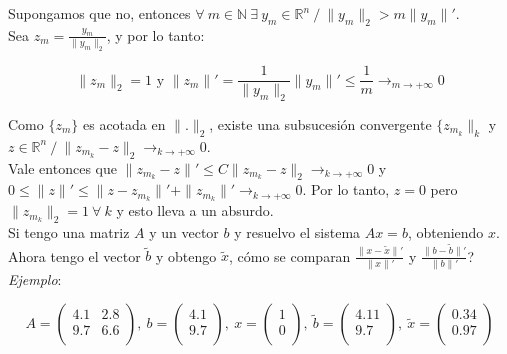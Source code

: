 Supongamos que no, entonces $\forall \ m \in \mathbb{N}\ \exists \ y_{m} \in \mathbb{R}^{n}\ / \ \|y_{m}\|_{2} > m \|y_{m}\|'$.\\

Sea $z_{m} = \frac{y_{m}}{\|y_{m}\|_{2}}$, y por lo tanto:

$$\|z_{m}\|_{2} = 1 \text{ y } \|z_{m}\|' = \frac{1}{\|y_{m}\|_{2}}\|y_{m}\|' \leq \frac{1}{m} \rightarrow_{m \rightarrow +\infty} 0$$

Como $\{z_{m}\}$ es acotada en $\|.\|_{2}$, existe una subsucesi\'on convergente $\{z_{m_{k}}\|_{k}$ y $z \in \mathbb{R}^{n}\ / \ \|z_{m_{k}} - z\|_{2} \rightarrow_{k \rightarrow +\infty} 0$.\\

Vale entonces que $\|z_{m_{k}} - z\|' \leq C\|z_{m_{k}} - z\|_{2} \rightarrow_{k \rightarrow +\infty} 0$ y $0 \leq \|z\|' \leq \|z - z_{m_{k}}\|' + \|z_{m_{k}}\|' \rightarrow_{k \rightarrow +\infty} 0$. Por lo tanto, $z = 0$ pero $\|z_{m_{k}}\|_{2} = 1\ \forall \ k$ y esto lleva a un absurdo.\\

Si tengo una matriz $A$ y un vector $b$ y resuelvo el sistema $Ax = b$, obteniendo $x$. Ahora tengo el vector $\tilde{b}$ y obtengo $\tilde{x}$, c\'omo se comparan $\frac{\|x - \tilde{x}\|'}{\|x\|'}$ y $\frac{\|b - \tilde{b}\|'}{\|b\|'}$?\\

\textit{Ejemplo}:

$$ A = 
	\begin{pmatrix}
        4.1 & 2.8\\
        9.7 & 6.6\\
	\end{pmatrix}
	,\ b = 
    \begin{pmatrix}
        4.1\\
        9.7\\
	\end{pmatrix}
	,\ x = 
    \begin{pmatrix}
        1\\
        0\\
	\end{pmatrix}
	,\ \tilde{b} =
	\begin{pmatrix}
        4.11\\
        9.7\\
	\end{pmatrix}
	,\ \tilde{x} =
	\begin{pmatrix}
        0.34\\
        0.97\\
	\end{pmatrix}
$$

